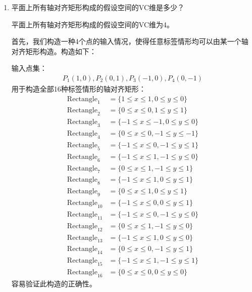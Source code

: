 \documentclass[12pt, a4paper]{article}
\begin{document}
    \begin{enumerate}

    \item 平面上所有轴对齐矩形构成的假设空间的VC维是多少？

        平面上所有轴对齐矩形构成的假设空间的VC维为4。

        首先，我们构造一种4个点的输入情况，使得任意标签情形均可以由某一个轴对齐矩形构造。构造如下：

        输入点集：
        \begin{align*}
        P_1(1, 0), P_2(0, 1), P_3(-1, 0), P_4(0, -1)
        \end{align*}
        用于构造全部16种标签情形的轴对齐矩形：
        \begin{align*}
        \text{Rectangle}_{1} &= \{1 \le x \le 1, 0 \le y \le 0\} \\
        \text{Rectangle}_{2} &= \{0 \le x \le 0, 1 \le y \le 1\} \\
        \text{Rectangle}_{3} &= \{-1 \le x \le -1, 0 \le y \le 0\} \\
        \text{Rectangle}_{4} &= \{0 \le x \le 0, -1 \le y \le -1\} \\
        \text{Rectangle}_{5} &= \{-1 \le x \le 0, -1 \le y \le 1\} \\
        \text{Rectangle}_{6} &= \{-1 \le x \le 1, -1 \le y \le 0\} \\
        \text{Rectangle}_{7} &= \{0 \le x \le 1, -1 \le y \le 1\} \\
        \text{Rectangle}_{8} &= \{-1 \le x \le 1, 0 \le y \le 1\} \\
        \text{Rectangle}_{9} &= \{0 \le x \le 1, 0 \le y \le 1\} \\
        \text{Rectangle}_{10} &= \{-1 \le x \le 0, 0 \le y \le 1\} \\
        \text{Rectangle}_{11} &= \{-1 \le x \le 0, -1 \le y \le 0\} \\
        \text{Rectangle}_{12} &= \{0 \le x \le 1, -1 \le y \le 0\} \\
        \text{Rectangle}_{13} &= \{-1 \le x \le 1, 0 \le y \le 0\} \\
        \text{Rectangle}_{14} &= \{0 \le x \le 0, -1 \le y \le 1\} \\
        \text{Rectangle}_{15} &= \{-1 \le x \le 1, -1 \le y \le 1\} \\
        \text{Rectangle}_{16} &= \{0 \le x \le 0, 0 \le y \le 0\}
        \end{align*}
        容易验证此构造的正确性。


\end{enumerate}
\end{document}
